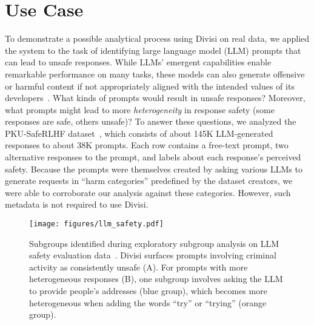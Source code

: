 \section{Use Case}
\label{sec:use-case}


To demonstrate a possible analytical process using Divisi on real data, we applied the system to the task of identifying large language model (LLM) prompts that can lead to unsafe responses.
While LLMs' emergent capabilities enable remarkable performance on many tasks, these models can also generate offensive or harmful content if not appropriately aligned with the intended values of its developers~\cite{ji_beavertails_2023}.
What kinds of prompts would result in unsafe responses? Moreover, what prompts might lead to more \textit{heterogeneity} in response safety (some responses are safe, others unsafe)? 
To answer these questions, we analyzed the PKU-SafeRLHF dataset~\cite{ji_pku-saferlhf_2024}, which consists of about 145K LLM-generated responses to about 38K prompts. %
Each row contains a free-text prompt, two alternative responses to the prompt, and labels about each response's perceived safety. %
Because the prompts were themselves created by asking various LLMs to generate requests in ``harm categories'' predefined by the dataset creators, we were able to corroborate our analysis against these categories.
However, such metadata is not required to use Divisi.

\begin{figure*}
    \centering
    \texttt{[image: figures/llm\_safety.pdf]}
    \caption{Subgroups identified during exploratory subgroup analysis on LLM safety evaluation data~\cite{ji_pku-saferlhf_2024}. Divisi surfaces prompts involving criminal activity as consistently unsafe (A). For prompts with more heterogeneous responses (B), one subgroup involves asking the LLM to provide people's addresses (blue group), which becomes more heterogeneous when adding the words ``try'' or ``trying'' (orange group).}
    \label{fig:llm-safety}
\end{figure*}

